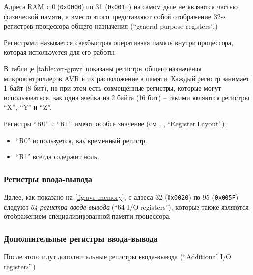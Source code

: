 \documentclass[../sparc.tex]{subfiles}
\begin{document}
Адреса \gls{RAM} с 0 (\texttt{0x0000}) по 31 (\texttt{0x001F})
на самом деле не являются частью физической памяти, а вместо этого представляют
собой отображение 32-х регистров процессора общего назначения (``general purpose
registers''.)

Регистрами называется свехбыстрая оперативная память внутри процессора, которая
используется для его работы.

В таблице \ref{table:avr-gpwr} показаны регистры общего назначения
микроконтроллеров AVR и их расположение в памяти.  Каждый регистр занимает 1
байт (8 бит), но при этом есть совмещённые регистры, которые могут
использоваться, как одна ячейка на 2 байта (16 бит) -- такими являются регистры
``X'', ``Y'' и ``Z''.

Регистры ``R0'' и ``R1'' имеют особое значение (см \cite{avr:gcc}, , ``Register
Layout''):
\begin{itemize}
\item ``R0'' используется, как временный регистр.
\item ``R1'' всегда содержит ноль.
\end{itemize}

\subsubsection{Регистры ввода-вывода}

Далее, как показано на \ref{fig:avr-memory}, с адреса 32
(\texttt{0x0020}) по 95 (\texttt{0x005F}) следуют \emph{64
регистра ввода-вывода} (``64 I/O registers''), которые также являются
отображением специализированной памяти процессора.

\subsubsection{Дополнительные регистры ввода-вывода}

После этого идут дополнительные регистры ввода-вывода (``Additional I/O
registers''.)
\end{document}
